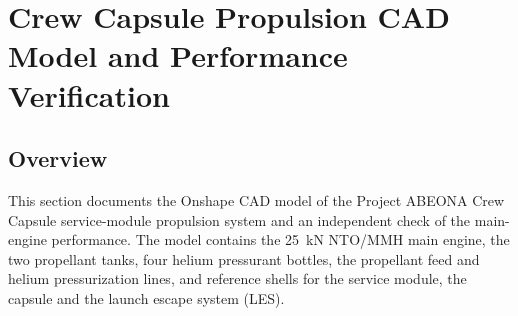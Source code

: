 \documentclass[10pt]{article}
\begin{document}
\begin{table}[H]\centering\small\caption{Propulsion-system mass build-up.}\label{tab:mass}\end{table}

\section{Crew Capsule Propulsion CAD Model and Performance Verification}\label{cad:top}

\subsection{Overview}
This section documents the Onshape CAD model of the Project ABEONA Crew Capsule service-module propulsion system and an
independent check of the main-engine performance. The model contains the 25~kN NTO/MMH main engine, the two propellant
tanks, four helium pressurant bottles, the propellant feed and helium pressurization lines, and reference shells for the
service module, the capsule and the launch escape system (LES).
\end{document}
